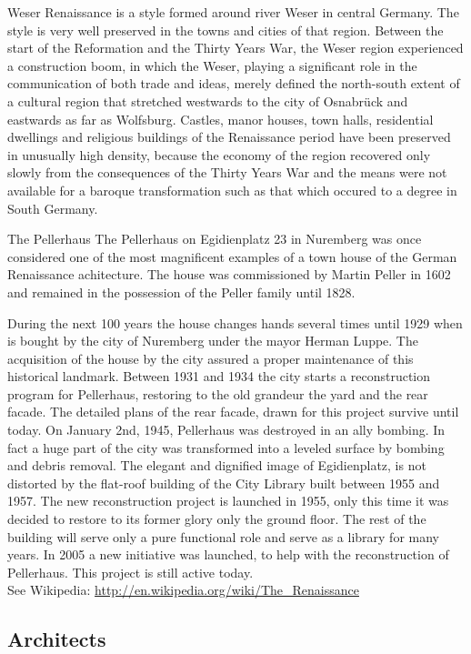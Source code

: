 Weser Renaissance is a style formed around river Weser in central Germany. The style is very well preserved in the towns and cities of that region. 
Between the start of the Reformation and the Thirty Years War, the Weser region experienced a construction boom, in which the Weser, playing a significant role in the communication of both trade and ideas, merely defined the north-south extent of a cultural region that stretched westwards to the city of Osnabrück and eastwards as far as Wolfsburg.
Castles, manor houses, town halls, residential dwellings and religious buildings of the Renaissance period have been preserved in unusually high density, because the economy of the region recovered only slowly from the consequences of the Thirty Years War and the means were not available for a baroque transformation such as that which occured to a degree in South Germany.

The Pellerhaus
The Pellerhaus on Egidienplatz 23 in Nuremberg was once considered one of the most magnificent examples of a town house of the German Renaissance achitecture.
The house was commissioned by Martin Peller in 1602 and remained in the possession of the Peller family until 1828. 

During the next 100 years the house changes hands several times until 1929 when is bought by the city of Nuremberg under the mayor Herman Luppe. The acquisition of the house by the city assured a proper maintenance of this historical landmark.
Between 1931 and 1934 the city starts a reconstruction program for Pellerhaus, restoring to the old grandeur the yard and the rear facade. The detailed plans of the rear facade, drawn for this project survive until today.
On January 2nd, 1945, Pellerhaus was destroyed in an ally bombing. In fact a huge part of the city was transformed into a leveled surface by bombing and debris removal. 
The elegant and dignified image of Egidienplatz, is not distorted by the flat-roof building of the City Library built between 1955 and 1957. The new reconstruction project is launched in 1955, only this time it was decided to restore to its former glory only the ground floor. The rest of the building will serve only a pure functional role and serve as a library for many years.
In 2005 a new initiative was launched, to help with the reconstruction of Pellerhaus. This project is still active today.\\


See Wikipedia: \url{http://en.wikipedia.org/wiki/The_Renaissance} 

\subsection{Architects}

